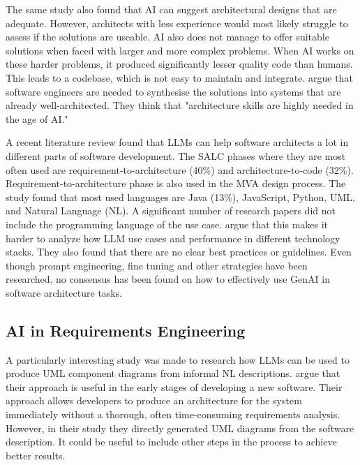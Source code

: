 The same study also found that AI can suggest architectural designs that are adequate. However, architects with less experience would most likely struggle to assess if the solutions are useable. AI also does not manage to offer suitable solutions when faced with larger and more complex problems. When AI works on these harder problems, it produced significantly lesser quality code than humans. This leads to a codebase, which is not easy to maintain and integrate. \citeauthor{amasantiImpactAIGeneratedSolutions2026} argue that software engineers are needed to synthesise the solutions into systems that are already well-architected. They think that "architecture skills are highly needed in the age of AI."

A recent literature review \parencite{espositoGenerativeAISoftware2026} found that LLMs can help software architects a lot in different parts of software development. The SALC phases where they are most often used are requirement-to-architecture (40\%) and architecture-to-code (32\%). Requirement-to-architecture phase is also used in the MVA design process. The study found that most used languages are Java (13\%), JavaScript, Python, UML, and Natural Language (NL). A significant number of research papers did not include the programming language of the use case. \citeauthor{espositoGenerativeAISoftware2026} argue that this makes it harder to analyze how LLM use cases and performance in different technology stacks. They also found that there are no clear best practices or guidelines. Even though prompt engineering, fine tuning and other strategies have been researched, no consensus has been found on how to effectively use GenAI in software architecture tasks.


\subsection{AI in Requirements Engineering}
A particularly interesting study \parencite{tagliaferroLeveragingLLMsAutomate2025} was made to research how LLMs can be used to produce UML component diagrams from informal NL descriptions. \citeauthor{tagliaferroLeveragingLLMsAutomate2025} argue that their approach is useful in the early stages of developing a new software. Their approach allows developers to produce an architecture for the system immediately without a thorough, often time-consuming requirements analysis. However, in their study they directly generated UML diagrams from the software description. It could be useful to include other steps in the process to achieve better results.

